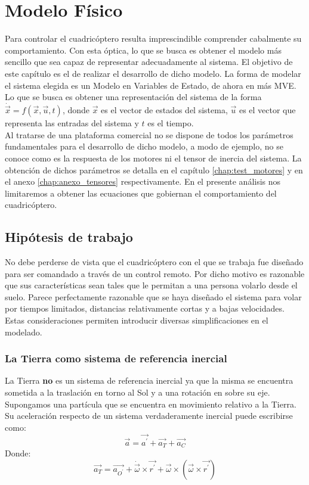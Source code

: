 \documentclass[main]{subfiles}
\begin{document}
\chapter{Modelo F\'isico}
\label{chap:modelo}
Para controlar el cuadric\'optero resulta imprescindible comprender cabalmente su comportamiento. Con esta \'optica, lo que se busca es obtener el modelo m\'as sencillo que sea capaz de representar adecuadamente al sistema. El objetivo de este cap\'itulo es el de realizar el desarrollo de dicho modelo. La forma de modelar el sistema elegida es un Modelo en Variables de Estado, de ahora en m\'as MVE. Lo que se busca es obtener una representaci\'on del sistema de la forma $\dot{\vec{x}}=f\left(\vec{x},\vec{u},t\right)$, donde $\vec{x}$ es el vector de estados del sistema, $\vec{u}$ es el vector que representa las entradas del sistema y $t$ es el tiempo. \\

Al tratarse de una plataforma comercial no se dispone de todos los par\'ametros fundamentales para el desarrollo de dicho modelo, a modo de ejemplo, no se conoce como es la respuesta de los motores  ni el tensor de inercia del sistema. La obtenci\'on de dichos par\'ametros se detalla en el cap\'itulo \ref{chap:test_motores} y en el anexo \ref{chap:anexo_tensores} respectivamente. En el presente an\'alisis nos limitaremos a obtener las ecuaciones que gobiernan el comportamiento del cuadric\'optero.\\
    


\section{Hip\'otesis de trabajo}

No debe perderse de vista que el cuadric\'optero con el que se trabaja fue dise\~nado para ser comandado a trav\'es de un control remoto. Por dicho motivo es razonable que sus caracter\'isticas sean tales que le permitan a una persona volarlo desde el suelo. Parece perfectamente razonable que se haya dise\~nado el sistema para volar por tiempos limitados, distancias relativamente cortas y a bajas velocidades. Estas consideraciones permiten introducir diversas simplificaciones en el modelado.


\subsection{La Tierra como sistema de referencia inercial}
La Tierra {\bf no} es un sistema de referencia inercial ya que la misma se encuentra sometida a la traslaci\'on en torno al Sol y a una rotaci\'on en sobre su eje. Supongamos una part\'icula que se encuentra en movimiento relativo a la Tierra. Su aceleraci\'on respecto de un sistema verdaderamente inercial puede escribirse como:
\begin{equation}
\vec{a}=\vec{a^\prime}+\vec{a_T} +\vec{a_C}
\end{equation}
Donde:
\begin{equation}
\vec{a_T}=\vec{a_{O^\prime}}+\dot{\vec{\omega}}\times\vec{r^\prime}+\vec{\omega}\times (\vec{\omega}\times\vec{r^\prime})
\end{equation}
\end{document}
